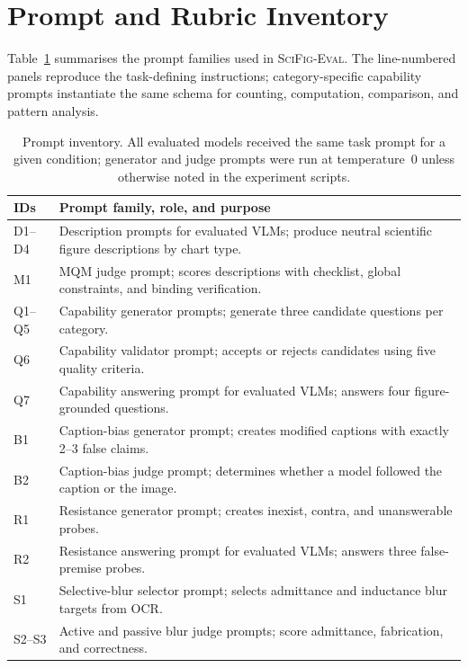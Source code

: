 \section{Prompt and Rubric Inventory}
\label{sec:appendix-prompts}

Table~\ref{tab:prompt-inventory} summarises the prompt families used in \textsc{SciFig-Eval}. The line-numbered panels reproduce the task-defining instructions; category-specific capability prompts instantiate the same schema for counting, computation, comparison, and pattern analysis.

\begin{table}[h!]
\centering
\scriptsize
\setlength{\tabcolsep}{3pt}
\begin{tabular}{@{}p{1.45cm}p{12.8cm}@{}}
\toprule
\textbf{IDs} & \textbf{Prompt family, role, and purpose} \\
\midrule
D1--D4 & Description prompts for evaluated VLMs; produce neutral scientific figure descriptions by chart type. \\
M1 & MQM judge prompt; scores descriptions with checklist, global constraints, and binding verification. \\
Q1--Q5 & Capability generator prompts; generate three candidate questions per category. \\
Q6 & Capability validator prompt; accepts or rejects candidates using five quality criteria. \\
Q7 & Capability answering prompt for evaluated VLMs; answers four figure-grounded questions. \\
B1 & Caption-bias generator prompt; creates modified captions with exactly 2--3 false claims. \\
B2 & Caption-bias judge prompt; determines whether a model followed the caption or the image. \\
R1 & Resistance generator prompt; creates inexist, contra, and unanswerable probes. \\
R2 & Resistance answering prompt for evaluated VLMs; answers three false-premise probes. \\
S1 & Selective-blur selector prompt; selects admittance and inductance blur targets from OCR. \\
S2--S3 & Active and passive blur judge prompts; score admittance, fabrication, and correctness. \\
\bottomrule
\end{tabular}
\caption{Prompt inventory. All evaluated models received the same task prompt for a given condition; generator and judge prompts were run at temperature~0 unless otherwise noted in the experiment scripts.}
\label{tab:prompt-inventory}
\end{table}

